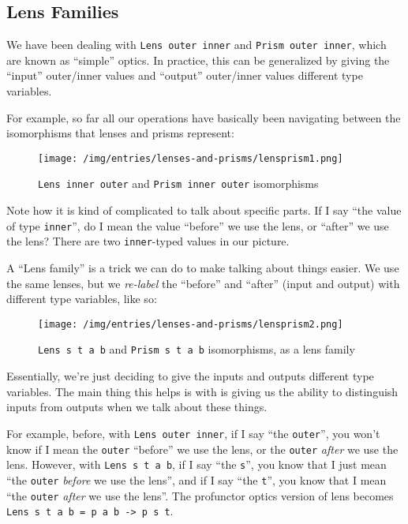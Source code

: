 \documentclass[]{article}
\begin{document}
\hypertarget{lens-families}{%
\subsection{Lens Families}\label{lens-families}}

We have been dealing with \texttt{Lens\textquotesingle{}\ outer\ inner} and
\texttt{Prism\textquotesingle{}\ outer\ inner}, which are known as ``simple''
optics. In practice, this can be generalized by giving the ``input'' outer/inner
values and ``output'' outer/inner values different type variables.

For example, so far all our operations have basically been navigating between
the isomorphisms that lenses and prisms represent:

\begin{figure}
\centering
\texttt{[image: /img/entries/lenses-and-prisms/lensprism1.png]}
\caption{\texttt{Lens\textquotesingle{}\ inner\ outer} and
\texttt{Prism\textquotesingle{}\ inner\ outer} isomorphisms}
\end{figure}

Note how it is kind of complicated to talk about specific parts. If I say ``the
value of type \texttt{inner}'', do I mean the value ``before'' we use the lens,
or ``after'' we use the lens? There are two \texttt{inner}-typed values in our
picture.

A ``Lens family'' is a trick we can do to make talking about things easier. We
use the same lenses, but we \emph{re-label} the ``before'' and ``after'' (input
and output) with different type variables, like so:

\begin{figure}
\centering
\texttt{[image: /img/entries/lenses-and-prisms/lensprism2.png]}
\caption{\texttt{Lens\ s\ t\ a\ b} and \texttt{Prism\ s\ t\ a\ b} isomorphisms,
as a lens family}
\end{figure}

Essentially, we're just deciding to give the inputs and outputs different type
variables. The main thing this helps is with is giving us the ability to
distinguish inputs from outputs when we talk about these things.

For example, before, with \texttt{Lens\textquotesingle{}\ outer\ inner}, if I
say ``the \texttt{outer}'', you won't know if I mean the \texttt{outer}
``before'' we use the lens, or the \texttt{outer} \emph{after} we use the lens.
However, with \texttt{Lens\ s\ t\ a\ b}, if I say ``the \texttt{s}'', you know
that I just mean ``the \texttt{outer} \emph{before} we use the lens'', and if I
say ``the \texttt{t}'', you know that I mean ``the \texttt{outer} \emph{after}
we use the lens''. The profunctor optics version of lens becomes
\texttt{Lens\ s\ t\ a\ b\ =\ p\ a\ b\ -\textgreater{}\ p\ s\ t}.
\end{document}

